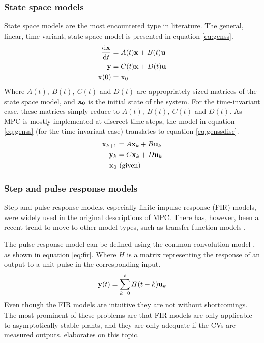 \subsubsection{State space models}
State space models are the most encountered type in literature.
The general, linear, time-variant, state space model is presented in equation \ref{eq:genss}.
\begin{align}
  \label{eq:genss}
  \frac{\mathrm{d}{\bf {x}}}{\mathrm{d}t} &= A(t){\bf {x}} + B(t){\bf {u}} \notag \\
  {\bf {y}} &= C(t){\bf {x}} + D(t){\bf {u}} \\
  {\bf {x}}(0) &= {\bf {x}}_0 \notag
\end{align}
Where $A(t),~B(t),~C(t)$ and $D(t)$ are appropriately sized matrices of the state space model, and ${\bf {x}}_0$ is the initial state of the system.
For the time-invariant case, these matrices simply reduce to $A(t),~B(t),~C(t)$ and $D(t)$. 
As MPC is mostly implemented at discreet time steps, the model in equation \ref{eq:genss} (for the time-invariant case) translates to equation \ref{eq:genssdisc}.
\begin{align}
  \label{eq:genssdisc}
  {\bf {x}}_{k+1} &= A{\bf {x}}_k + B{\bf {u}}_k \notag \\
  {\bf {y}}_k &= C{\bf {x}}_k + D{\bf {u}}_k \\
  {\bf {x}}_0 &~ \text{(given)} \notag
\end{align}

\subsubsection{Step and pulse response models}
Step and pulse response models, especially finite impulse response (FIR) models, were widely used in the original descriptions of MPC.
There has, however, been a recent trend to move to other model types, such as transfer function models .

The pulse response model can be defined using the common convolution model \citep[284]{luyben}, as shown in equation \ref{eq:fir}.
Where $H$ is a matrix representing the response of an output to a unit pulse in the corresponding input.
\begin{equation}
  \label{eq:fir}
  {\bf {y}}(t) = \sum^t_{k=0}H(t-k){\bf {u}}_k
\end{equation} 
Even though the FIR models are intuitive they are not without shortcomings.
The most prominent of these problems are that FIR models are only applicable to asymptotically stable plants, and they are only adequate if the CVs are measured outputs.
\citet[109]{maciejowskimpc} elaborates on this topic.

